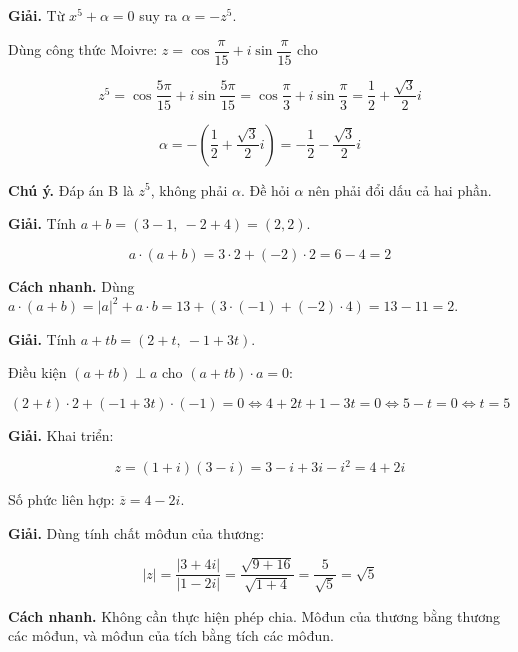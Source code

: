 \documentclass[11pt, a4paper]{article}
\begin{document}
\begin{dapan}[10 — Đáp án D]
\textbf{Giải.} Từ $x^5 + \alpha = 0$ suy ra $\alpha = -z^5$.

Dùng công thức Moivre: $z = \cos\dfrac{\pi}{15} + i\sin\dfrac{\pi}{15}$ cho

$$z^5 = \cos\frac{5\pi}{15} + i\sin\frac{5\pi}{15} = \cos\frac{\pi}{3} + i\sin\frac{\pi}{3} = \frac{1}{2} + \frac{\sqrt{3}}{2}i$$

$$\alpha = -\left(\frac{1}{2} + \frac{\sqrt{3}}{2}i\right) = -\frac{1}{2} - \frac{\sqrt{3}}{2}i$$

\textbf{Chú ý.} Đáp án B là $z^5$, không phải $\alpha$. Đề hỏi $\alpha$ nên phải đổi dấu cả hai phần.
\end{dapan}

\begin{dapan}[11 — Đáp án A]
\textbf{Giải.} Tính $a + b = (3 - 1,\ -2 + 4) = (2, 2)$.

$$a \cdot (a+b) = 3 \cdot 2 + (-2) \cdot 2 = 6 - 4 = 2$$

\textbf{Cách nhanh.} Dùng $a \cdot (a+b) = \lvert a \rvert^2 + a \cdot b = 13 + (3 \cdot (-1) + (-2) \cdot 4) = 13 - 11 = 2$.
\end{dapan}

\begin{dapan}[12 — Đáp án A]
\textbf{Giải.} Tính $a + tb = (2 + t,\ -1 + 3t)$.

Điều kiện $(a + tb) \perp a$ cho $(a + tb) \cdot a = 0$:

$$(2+t) \cdot 2 + (-1+3t) \cdot (-1) = 0 \iff 4 + 2t + 1 - 3t = 0 \iff 5 - t = 0 \iff t = 5$$
\end{dapan}

\begin{dapan}[13 — Đáp án D]
\textbf{Giải.} Khai triển:

$$z = (1+i)(3-i) = 3 - i + 3i - i^2 = 4 + 2i$$

Số phức liên hợp: $\overline{z} = 4 - 2i$.
\end{dapan}

\begin{dapan}[14 — Đáp án A]
\textbf{Giải.} Dùng tính chất môđun của thương:

$$\lvert z \rvert = \frac{\lvert 3 + 4i \rvert}{\lvert 1 - 2i \rvert} = \frac{\sqrt{9 + 16}}{\sqrt{1 + 4}} = \frac{5}{\sqrt{5}} = \sqrt{5}$$

\textbf{Cách nhanh.} Không cần thực hiện phép chia. Môđun của thương bằng thương các môđun, và môđun của tích bằng tích các môđun.
\end{dapan}
\end{document}
